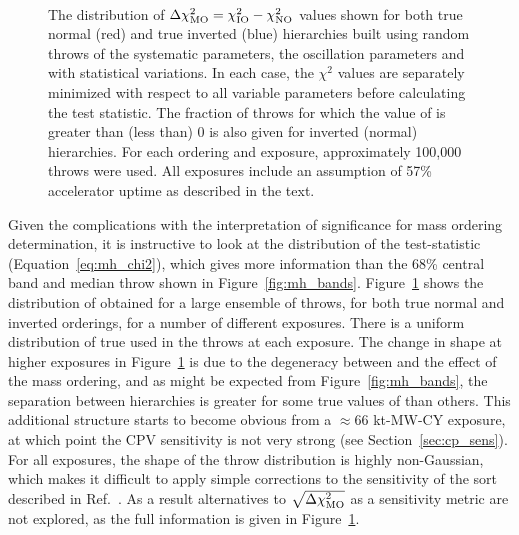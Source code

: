 \begin{figure*}[htbp]
  \centering
  \\
  \caption{The distribution of $\Delta\chi^{2}_{\mathrm{MO}} = \chi^{2}_{\mathrm{IO}} - \chi^{2}_{\mathrm{NO}}$ values shown for both true normal (red) and true inverted (blue) hierarchies built using random throws of the systematic parameters, the oscillation parameters and with statistical variations. In each case, the $\chi^{2}$ values are separately minimized with respect to all variable parameters before calculating the test statistic. The fraction of throws for which the value of \dchisqMO is greater than (less than) 0 is also given for inverted (normal) hierarchies. For each ordering and exposure, approximately 100,000 throws were used. All exposures include an assumption of 57\% accelerator uptime as described in the text.}
  \label{fig:mh_comp_over_time}
\end{figure*}
Given the complications with the interpretation of significance for mass ordering determination, it is instructive to look at the distribution of the test-statistic (Equation~\ref{eq:mh_chi2}), which gives more information than the 68\% central band and median throw shown in Figure~\ref{fig:mh_bands}. Figure~\ref{fig:mh_comp_over_time} shows the distribution of \dchisqMO obtained for a large ensemble of throws, for both true normal and inverted orderings, for a number of different exposures. There is a uniform distribution of true \deltacp used in the throws at each exposure. The change in shape at higher exposures in Figure~\ref{fig:mh_comp_over_time} is due to the degeneracy between \deltacp and the effect of the mass ordering, and as might be expected from Figure~\ref{fig:mh_bands}, the separation between hierarchies is greater for some true values of \deltacp than others. This additional structure starts to become obvious from a $\approx$66 kt-MW-CY exposure, at which point the CPV sensitivity is not very strong (see Section~\ref{sec:cp_sens}). For all exposures, the shape of the throw distribution is highly non-Gaussian, which makes it difficult to apply simple corrections to the sensitivity of the sort described in Ref.~\cite{Blennow:2013oma}. As a result alternatives to $\sqrt{\Delta\chi^{2}_{\mathrm{MO}}}$ as a sensitivity metric are not explored, as the full information is given in Figure~\ref{fig:mh_comp_over_time}.

